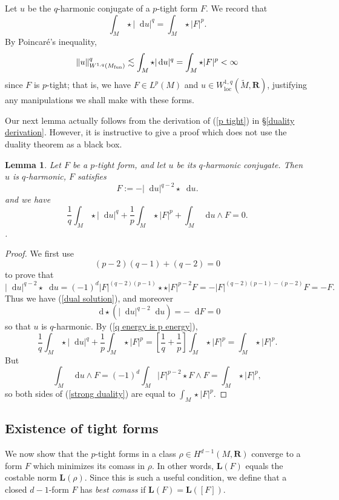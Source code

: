 \documentclass[reqno,11pt]{amsart}
\newcommand{\RR}{\mathbf{R}}
\newcommand*\dif{\mathop{}\!\mathrm{d}}
\newcommand{\Comass}{\mathbf L}
\newcommand{\dfn}[1]{\emph{#1}\index{#1}}
\newcommand{\loc}{\mathrm{loc}}
\newtheorem{lemma}[theorem]{Lemma}
\theoremstyle{definition}
\numberwithin{equation}{section}
\begin{document}
Let $u$ be the $q$-harmonic conjugate of a $p$-tight form $F$.
We record that 
\begin{equation}\label{q energy is p energy}
\int_M \star |\dif u|^q = \int_M \star |F|^p.
\end{equation}
By Poincar\'e's inequality,
$$\|u\|_{W^{1, q}(M_{\rm fun})}^q \lesssim \int_M \star |\dif u|^q = \int_M \star |F|^p < \infty$$
since $F$ is $p$-tight; that is, we have $F \in L^p(M)$ and $u \in W^{1, q}_\loc(\tilde M, \RR)$, justifying any manipulations we shall make with these forms.

Our next lemma actually follows from the derivation of (\ref{p tight}) in \S\ref{duality derivation}.
However, it is instructive to give a proof which does not use the duality theorem as a black box.

\begin{lemma}
Let $F$ be a $p$-tight form, and let $u$ be its $q$-harmonic conjugate.
Then $u$ is $q$-harmonic, $F$ satisfies
\begin{equation}\label{dual solution}
F := -|\dif u|^{q - 2} \star \dif u.
\end{equation}
 and we have
\begin{equation}\label{strong duality}
\frac{1}{q} \int_M \star |\dif u|^q + \frac{1}{p} \int_M \star |F|^p + \int_M \dif u \wedge F = 0.
\end{equation}.
\end{lemma}
\begin{proof}
We first use
$$(p - 2)(q - 1) + (q - 2) = 0$$
to prove that
$$|\dif u|^{q - 2} \star \dif u = (-1)^d |F|^{(q - 2)(p - 1)} \star \star |F|^{p - 2} F = - |F|^{(q - 2)(p - 1) - (p - 2)} F = - F.$$
Thus we have (\ref{dual solution}), and moreover
$$\dif \star (|\dif u|^{q - 2} \dif u) = - \dif F = 0$$
so that $u$ is $q$-harmonic.
By (\ref{q energy is p energy}),
$$\frac{1}{q} \int_M \star |\dif u|^q + \frac{1}{p} \int_M \star |F|^p = \left[\frac{1}{q} + \frac{1}{p}\right] \int_M \star |F|^p = \int_M \star |F|^p.$$
But
$$\int_M \dif u \wedge F = (-1)^d \int_M |F|^{p - 2} \star F \wedge F = \int_M \star |F|^p,$$
so both sides of (\ref{strong duality}) are equal to $\int_M \star |F|^p$.
\end{proof}


\subsection{\texorpdfstring{Existence of tight forms}{Existence of tight forms}}
We now show that the $p$-tight forms in a class $\rho \in H^{d - 1}(M, \RR)$ converge to a form $F$ which minimizes its comass in $\rho$.
In other words, $\Comass(F)$ equals the costable norm $\Comass(\rho)$.
Since this is such a useful condition, we define that a closed $d - 1$-form $F$ has \dfn{best comass} if $\Comass(F) = \Comass([F])$.
\end{document}
